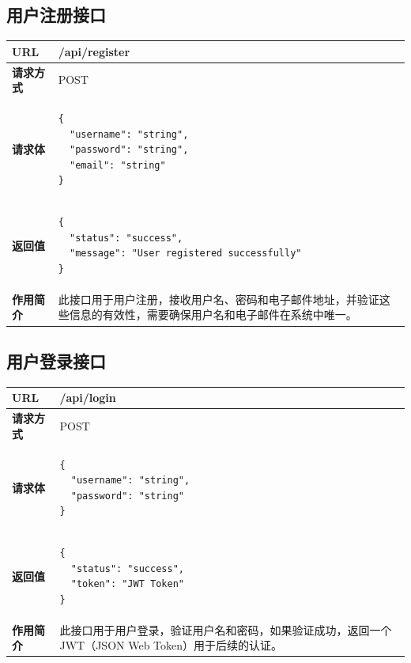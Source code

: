 \documentclass[12pt]{article}
\begin{document}
\subsection{用户注册接口}
\begin{longtable}{|p{3cm}|p{10cm}|}
\hline
\textbf{URL} & /api/register \\ \hline
\textbf{请求方式} & POST \\ \hline
\textbf{请求体} &
\begin{verbatim}
{
  "username": "string",
  "password": "string",
  "email": "string"
}
\end{verbatim} \\ \hline
\textbf{返回值} &
\begin{verbatim}
{
  "status": "success",
  "message": "User registered successfully"
}
\end{verbatim} \\ \hline
\textbf{作用简介} & 此接口用于用户注册，接收用户名、密码和电子邮件地址，并验证这些信息的有效性，需要确保用户名和电子邮件在系统中唯一。 \\ \hline
\end{longtable}

\subsection{用户登录接口}
\begin{longtable}{|p{3cm}|p{10cm}|}
\hline
\textbf{URL} & /api/login \\ \hline
\textbf{请求方式} & POST \\ \hline
\textbf{请求体} &
\begin{verbatim}
{
  "username": "string",
  "password": "string"
}
\end{verbatim} \\ \hline
\textbf{返回值} &
\begin{verbatim}
{
  "status": "success",
  "token": "JWT Token"
}
\end{verbatim} \\ \hline
\textbf{作用简介} & 此接口用于用户登录，验证用户名和密码，如果验证成功，返回一个JWT（JSON Web Token）用于后续的认证。 \\ \hline
\end{longtable}

\end{document}
